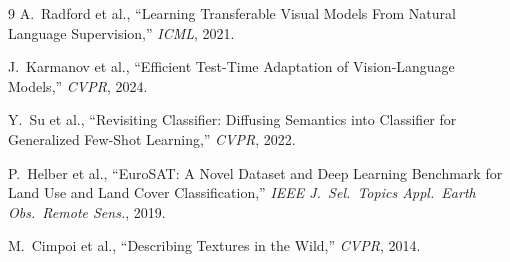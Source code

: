 \documentclass[12pt,a4paper]{article}
\newcommand{\1}{\mathbf{1}}
\begin{document}
\begin{thebibliography}{9}
A.\ Radford et al.,
``Learning Transferable Visual Models From Natural Language Supervision,''
\textit{ICML}, 2021.

J.\ Karmanov et al.,
``Efficient Test-Time Adaptation of Vision-Language Models,''
\textit{CVPR}, 2024.

Y.\ Su et al.,
``Revisiting Classifier: Diffusing Semantics into Classifier for Generalized Few-Shot Learning,''
\textit{CVPR}, 2022.

P.\ Helber et al.,
``EuroSAT: A Novel Dataset and Deep Learning Benchmark for Land Use and Land Cover Classification,''
\textit{IEEE J.\ Sel.\ Topics Appl.\ Earth Obs.\ Remote Sens.}, 2019.

M.\ Cimpoi et al.,
``Describing Textures in the Wild,''
\textit{CVPR}, 2014.
\end{thebibliography}
\end{document}
